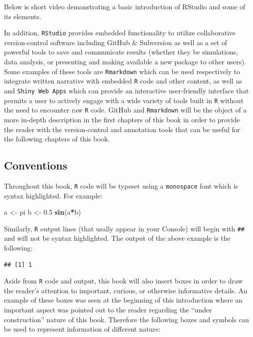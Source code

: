 \documentclass[12pt,]{krantz}
\newenvironment{Shaded}{\begin{snugshade}}{\end{snugshade}}
\newcommand{\KeywordTok}[1]{\textcolor[rgb]{0.27,0.27,0.27}{\textbf{#1}}}
\newcommand{\FloatTok}[1]{\textcolor[rgb]{0.06,0.06,0.06}{#1}}
\newcommand{\StringTok}[1]{\textcolor[rgb]{0.5,0.5,0.5}{#1}}
\newcommand{\OperatorTok}[1]{\textcolor[rgb]{0.43,0.43,0.43}{\textbf{#1}}}
\newcommand{\NormalTok}[1]{#1}
\begin{document}
Below is short video demonstrating a basic introduction of RStudio and
some of its elements.

In addition, \texttt{RStudio} provides embedded functionality to utilize
collaborative version-control software including GitHub \& Subversion as
well as a set of powerful tools to save and communicate results (whether
they be simulations, data analysis, or presenting and making available a
new package to other users). Some examples of these tools are
\texttt{Rmarkdown} which can be used respectively to integrate written
narrative with embedded \texttt{R} code and other content, as well as
and \texttt{Shiny\ Web\ Apps} which can provide an interactive
user-friendly interface that permits a user to actively engage with a
wide variety of tools built in \texttt{R} without the need to encounter
raw \texttt{R} code. GitHub and \texttt{Rmarkdown} will be the object of
a more in-depth description in the first chapters of this book in order
to provide the reader with the version-control and annotation tools that
can be useful for the following chapters of this book.

\subsection{Conventions}\label{conventions}

Throughout this book, \texttt{R} code will be typeset using a
\texttt{monospace} font which is syntax highlighted. For example:

\begin{Shaded}
\begin{Highlighting}[]
\NormalTok{a <-}\StringTok{ }\NormalTok{pi}
\NormalTok{b <-}\StringTok{ }\FloatTok{0.5}
\KeywordTok{sin}\NormalTok{(a}\OperatorTok{*}\NormalTok{b)}
\end{Highlighting}
\end{Shaded}

Similarly, \texttt{R} output lines (that usally appear in your Console)
will begin with \texttt{\#\#} and will not be syntax highlighted. The
output of the above example is the following:

\begin{verbatim}
## [1] 1
\end{verbatim}

Aside from \texttt{R} code and output, this book will also insert boxes
in order to draw the reader's attention to important, curious, or
otherwise informative details. An example of these boxes was seen at the
beginning of this introduction where an important aspect was pointed out
to the reader regarding the ``under construction'' nature of this book.
Therefore the following boxes and symbols can be used to represent
information of different nature:
\end{document}
